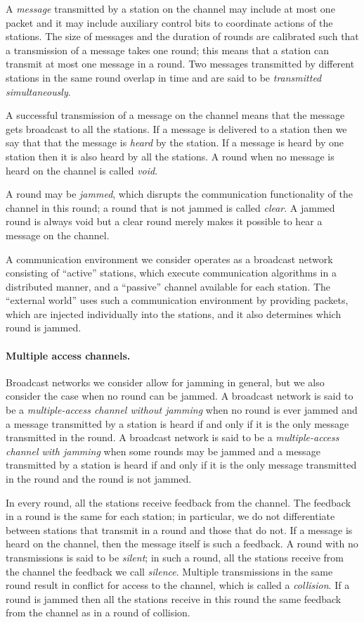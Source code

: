 \documentclass[11pt]{article}
\newcommand{\BBB}{\vspace*{-\bigskipamount}}
\newcommand{\Paragraph}[1]{\BBB\paragraph{#1}}
\begin{document}
A \emph{message} transmitted by a station on the channel may include at most one packet and it may include auxiliary control bits to coordinate actions of the stations.
The size of messages and the duration of rounds are calibrated such that a transmission of a message takes one round; this means that a station can transmit at most one message in a round.
Two messages transmitted by different stations in the same round overlap in time and are said to be \emph{transmitted simultaneously}.

A successful transmission of a message on the channel means that the message gets broadcast to all the stations.
If a message is delivered to a station then we say that that the message is \emph{heard} by the station.
If a message is heard by one station then it is also heard by all the stations. 
A round when no message is heard on the channel is called \emph{void}.

A round may be \emph{jammed}, which disrupts the communication functionality of the channel in this round; a round that is not jammed is called \emph{clear}.
A jammed round is always void but a clear round merely makes it possible to hear a message on the channel.

A communication environment we consider operates as a broadcast network consisting of ``active'' stations, which execute communication algorithms in a distributed manner, and a ``passive'' channel available for each station.
The ``external world'' uses such a communication environment by providing packets, which are injected individually into the stations, and it also determines which round is jammed.




\Paragraph{Multiple access channels.}


Broadcast networks we consider allow for jamming in general, but we also consider the case when no round can be jammed.
A broadcast network is said to be a \emph{multiple-access channel without jamming} when no round is ever jammed and a message transmitted by a station is heard if and only if it is the only message transmitted in the round. 
A broadcast network is said to be a \emph{multiple-access channel with jamming} when some rounds may be jammed and a message transmitted by a station is heard if and only if it is the only message transmitted in the round and the round is not jammed. 

In every round, all the stations receive feedback from the channel.
The feedback in a round is the same for each station; in particular, we do not differentiate between stations that transmit in a round and those that do not. 
If a message is heard on the channel, then the message itself is such a feedback.
A round with no transmissions is said to be \emph{silent}; in such a round,  all the stations receive from the channel the feedback we call \emph{silence}. 
Multiple transmissions in the same round result in conflict for access to the channel, which is called a \emph{collision}.
If a round is jammed then all the stations receive  in this round  the same feedback from the channel as in a round of collision.
\end{document}
